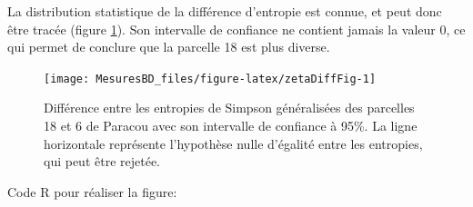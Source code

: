 \documentclass[
  11pt,
  french,
  a4paper,
  extrafontsizes,onecolumn,openright
  ]{memoir}
\newenvironment{Shaded}{\begin{snugshade}}{\end{snugshade}}
\newcommand{\CommentTok}[1]{\textcolor[rgb]{0.56,0.35,0.01}{\textit{#1}}}
\newcommand{\DataTypeTok}[1]{\textcolor[rgb]{0.13,0.29,0.53}{#1}}
\newcommand{\DecValTok}[1]{\textcolor[rgb]{0.00,0.00,0.81}{#1}}
\newcommand{\FloatTok}[1]{\textcolor[rgb]{0.00,0.00,0.81}{#1}}
\newcommand{\KeywordTok}[1]{\textcolor[rgb]{0.13,0.29,0.53}{\textbf{#1}}}
\newcommand{\NormalTok}[1]{#1}
\newcommand{\OperatorTok}[1]{\textcolor[rgb]{0.81,0.36,0.00}{\textbf{#1}}}
\newcommand{\StringTok}[1]{\textcolor[rgb]{0.31,0.60,0.02}{#1}}
\begin{document}
\normalsize

La distribution statistique de la différence d'entropie est connue, et peut donc être tracée (figure \ref{fig:zetaDiffFig}).
Son intervalle de confiance ne contient jamais la valeur 0, ce qui permet de conclure que la parcelle 18 est plus diverse.



\scriptsize

\begin{figure}

{\centering \texttt{[image: MesuresBD\_files/figure-latex/zetaDiffFig-1]} 

}

\caption{Différence entre les entropies de Simpson généralisées des parcelles 18 et 6 de Paracou avec son intervalle de confiance à 95\%. La ligne horizontale représente l'hypothèse nulle d'égalité entre les entropies, qui peut être rejetée.}\label{fig:zetaDiffFig}
\end{figure}

\normalsize

Code R pour réaliser la figure:

\scriptsize

\begin{Shaded}
\end{Shaded}
\end{document}
